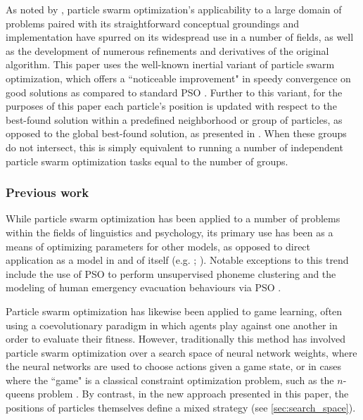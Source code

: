 \documentclass[12pt,a4paper]{article}
\begin{document}
As noted by \citet*[p.~99]{yang2014}, particle swarm optimization's applicability to a large domain of problems paired with its straightforward conceptual groundings and implementation have spurred on its widespread use in a number of fields, as well as the development of numerous refinements and derivatives of the original algorithm. This paper uses the well-known inertial variant of particle swarm optimization, which offers a ``noticeable improvement" in speedy convergence on good solutions as compared to standard PSO \citep[p.~101]{yang2014}. Further to this variant, for the purposes of this paper each particle's position is updated with respect to the best-found solution within a predefined neighborhood or group of particles, as opposed to the global best-found solution, as presented in \citet*[p.~79]{solnon2010}. When these groups do not intersect, this is simply equivalent to running a number of independent particle swarm optimization tasks equal to the number of groups.



\subsubsection{Previous work}
\label{sec:pso_prev_work}

While particle swarm optimization has been applied to a number of problems within the fields of linguistics and psychology, its primary use has been as a means of optimizing parameters for other models, as opposed to direct application as a model in and of itself (e.g. \citeauthor{chatterjee2005} \citeyear{chatterjee2005}; \citeauthor{mehdad2009} \citeyear{mehdad2009}). Notable exceptions to this trend include the use of PSO to perform unsupervised phoneme clustering \citep{ahmadi2007} and the modeling of human emergency evacuation behaviours via PSO \citep{cheng2008}.

Particle swarm optimization has likewise been applied to game learning, often using a coevolutionary paradigm in which agents play against one another in order to evaluate their fitness. However, traditionally this method has involved particle swarm optimization over a search space of neural network weights, where the neural networks are used to choose actions given a game state, or in cases where the ``game" is a classical constraint optimization problem, such as the $n$-queens problem \citep[p.~349-351]{engelbrecht2005}. By contrast, in the new approach presented in this paper, the positions of particles themselves define a mixed strategy (see \autoref{sec:search_space}).  
\end{document}
